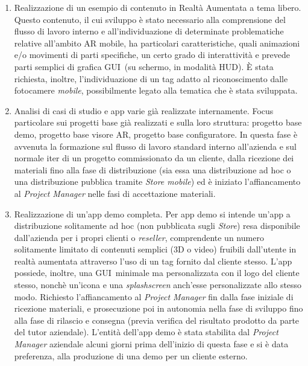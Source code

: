 \begin{enumerate}
	\item	Realizzazione di un esempio di contenuto in Realtà Aumentata a tema libero. Questo contenuto, il cui sviluppo è stato necessario alla comprensione del flusso di lavoro interno e all'individuazione di determinate problematiche relative all’ambito AR mobile, ha particolari caratteristiche, quali animazioni e/o movimenti di parti specifiche, un certo grado di interattività e prevede parti semplici di grafica GUI\gloss\ (su schermo, in modalità HUD). \`E stata richiesta, inoltre, l’individuazione di un tag adatto al riconoscimento dalle fotocamere \textit{mobile}, possibilmente legato alla tematica che \`e stata sviluppata.
	\item	Analisi di casi di studio e app varie già realizzate internamente. Focus particolare sui progetti base già realizzati e sulla loro struttura: progetto base demo, progetto base visore AR, progetto base configuratore. In questa fase \`e avvenuta la formazione sul flusso di lavoro standard interno all’azienda e sul normale iter di un progetto commissionato da un cliente, dalla ricezione dei materiali fino alla fase di distribuzione (sia essa una distribuzione ad hoc o una distribuzione pubblica tramite \textit{Store mobile}) ed \`e iniziato l'affiancamento al \textit{Project Manager} nelle fasi di accettazione materiali. 
	\item	Realizzazione di un’app demo completa. Per app demo si intende un’app a distribuzione solitamente ad hoc (non pubblicata sugli \textit{Store}) resa disponibile dall’azienda per i propri clienti o \textit{reseller}, comprendente un numero solitamente limitato di contenuti semplici (3D o video) fruibili dall’utente in realtà aumentata attraverso l’uso di un tag fornito dal cliente stesso. L’app possiede, inoltre, una GUI\gloss\ minimale ma personalizzata con il logo del cliente stesso, nonchè un’icona e una \textit{splashscreen} anch’esse personalizzate allo stesso modo. Richiesto l'affiancamento al \textit{Project Manager} fin dalla fase iniziale di ricezione materiali, e prosecuzione poi in autonomia nella fase di sviluppo fino alla fase di rilascio e consegna (previa verifica del risultato prodotto da parte del tutor aziendale). L’entità dell’app demo \`e stata stabilita dal \textit{Project Manager} aziendale alcuni giorni prima dell’inizio di questa fase e si \`e data preferenza, alla produzione di una demo per un cliente esterno. 

\end{enumerate}
